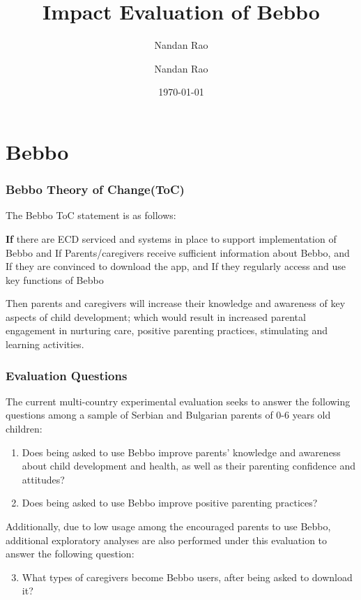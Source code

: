 \documentclass[aspectratio=169]{beamer}
\title[title]{Impact Evaluation of Bebbo}
\author[Nandan Rao]{Nandan Rao}
\author[me]{Nandan Rao}
\date[\today] {\today} %
\begin{document}
\section{Bebbo}

\begin{frame}
\frametitle{Bebbo Theory of Change(ToC)}
The Bebbo ToC statement is as follows:  

\textbf{If} there are ECD serviced and systems in place to support implementation of Bebbo   
and 
If Parents/caregivers receive sufficient information about Bebbo,  
and 
If they are convinced to download the app,  
and  
If they regularly access and use key functions of Bebbo 

Then parents and caregivers will increase their knowledge and awareness of key aspects of child development; which would result in increased parental engagement in nurturing care, positive parenting practices, stimulating and learning activities. 

\end{frame}


\begin{frame}
\frametitle{Evaluation Questions}

The current multi-country experimental evaluation seeks to answer the following questions among a sample of Serbian and Bulgarian parents of 0-6 years old children:  

\begin{enumerate}
\item Does being asked to use Bebbo improve parents’ knowledge and awareness about child development and health, as well as their parenting confidence and attitudes?
\item Does being asked to use Bebbo improve positive parenting practices?
\end{enumerate}

Additionally, due to low usage among the encouraged parents to use Bebbo, additional exploratory analyses are also performed under this evaluation to answer the following question:  

\begin{enumerate}
 \setcounter{enumi}{2}
\item What types of caregivers become Bebbo users, after being asked to download it? 
\end{enumerate}


\end{frame}
\end{document}
